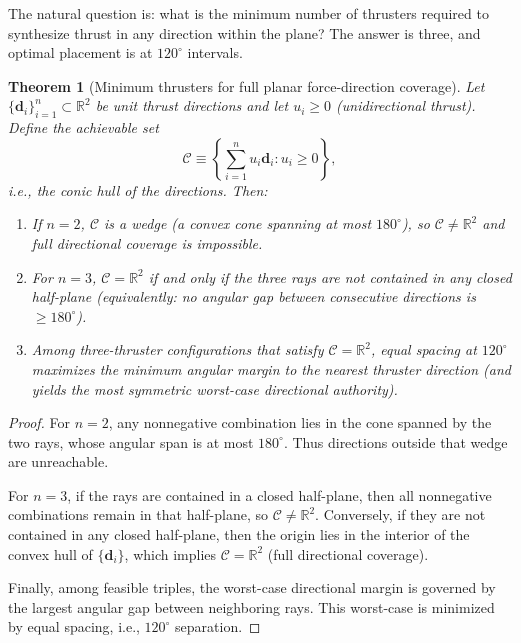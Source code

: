 \documentclass{article}
\newtheorem{theorem}{Theorem}
\begin{document}
The natural question is: what is the minimum number of thrusters required to synthesize thrust in any direction within the plane? The answer is three, and optimal placement is at $120^\circ$ intervals.

\begin{theorem}[Minimum thrusters for full planar force-direction coverage]
\label{thm:120}
Let $\{\mathbf d_i\}_{i=1}^n\subset\mathbb R^2$ be unit thrust directions and let $u_i\ge 0$
(unidirectional thrust). Define the achievable set
\[
\mathcal C \equiv \left\{\sum_{i=1}^n u_i\mathbf d_i : u_i\ge 0\right\},
\]
i.e., the conic hull of the directions. Then:
\begin{enumerate}
\item[\textup{(i)}] If $n=2$, $\mathcal C$ is a wedge (a convex cone spanning at most $180^\circ$),
so $\mathcal C\neq\mathbb R^2$ and full directional coverage is impossible.
\item[\textup{(ii)}] For $n=3$, $\mathcal C=\mathbb R^2$ if and only if the three rays are not
contained in any closed half-plane (equivalently: no angular gap between consecutive directions is $\ge 180^\circ$).
\item[\textup{(iii)}] Among three-thruster configurations that satisfy $\mathcal C=\mathbb R^2$,
equal spacing at $120^\circ$ maximizes the minimum angular margin to the nearest thruster direction
(and yields the most symmetric worst-case directional authority).
\end{enumerate}
\end{theorem}

\begin{proof}
For $n=2$, any nonnegative combination lies in the cone spanned by the two rays, whose angular span is at most $180^\circ$.
Thus directions outside that wedge are unreachable.

For $n=3$, if the rays are contained in a closed half-plane, then all nonnegative combinations remain in that half-plane,
so $\mathcal C\neq\mathbb R^2$. Conversely, if they are not contained in any closed half-plane, then the origin lies in the
interior of the convex hull of $\{\mathbf d_i\}$, which implies $\mathcal C=\mathbb R^2$ (full directional coverage).

Finally, among feasible triples, the worst-case directional margin is governed by the largest angular gap between neighboring rays.
This worst-case is minimized by equal spacing, i.e., $120^\circ$ separation.
\end{proof}
\end{document}
